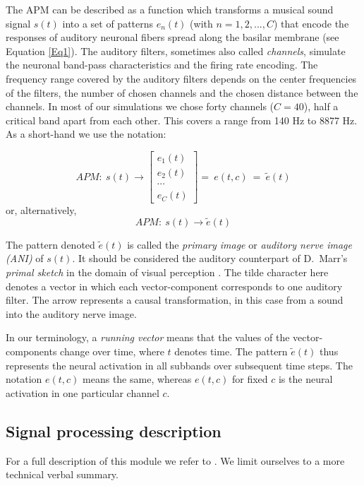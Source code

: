 The APM can be described as a function which transforms a musical
sound signal $s(t)$ into a set of patterns $e_n(t)$ (with $n = 1,
2, ..., C$) that encode the responses of auditory neuronal fibers
spread along the basilar membrane (see Equation \ref{Eq1}). The
auditory filters, sometimes also called {\sl channels}, simulate
the neuronal band-pass characteristics and the firing rate
encoding. The frequency range covered by the auditory filters
depends on the center frequencies of the filters, the number of
chosen channels and the chosen distance between the channels. In
most of our simulations we chose forty channels ($C=40$), half a
critical band apart from each other. This covers a range from 140
Hz to 8877 Hz. As a short-hand we use the notation:

\begin{displaymath}
APM:~s(t) \rightarrow \left[
\begin{array}{l}
e_1(t) \\ e_2(t) \\ \cdots \\ e_{C}(t)
\end{array}
\right]=~e(t,c)~=~\tilde{e}(t)
\end{displaymath}
or, alternatively,
\begin{equation}
APM:~s(t) \rightarrow \tilde{e}(t) \label{Eq1}
\end{equation}

The pattern denoted $\tilde{e}(t)$ is called the \emph{primary
image} or \emph{auditory nerve image (ANI)} of $s(t)$. It should
be considered the auditory counterpart of D.~Marr's {\sl primal
sketch} in the domain of visual perception \cite{Marr:82}. The
tilde character here denotes a vector in which each
vector-component corresponds to one auditory filter. The arrow
represents a causal transformation, in this case from a sound into
the auditory nerve image.

In our terminology, a \emph{running vector} means that the values
of the vector-components change over time, where $t$ denotes time.
The pattern $\tilde{e}(t)$ thus represents the neural activation
in all subbands over subsequent time steps. The notation $e(t,c)$
means the same, whereas $e(t,c)$ for fixed $c$ is the neural
activation in one particular channel $c$.

\subsection{Signal processing description}
For a full description of this module we refer to
. We limit ourselves to a more technical
verbal summary.


